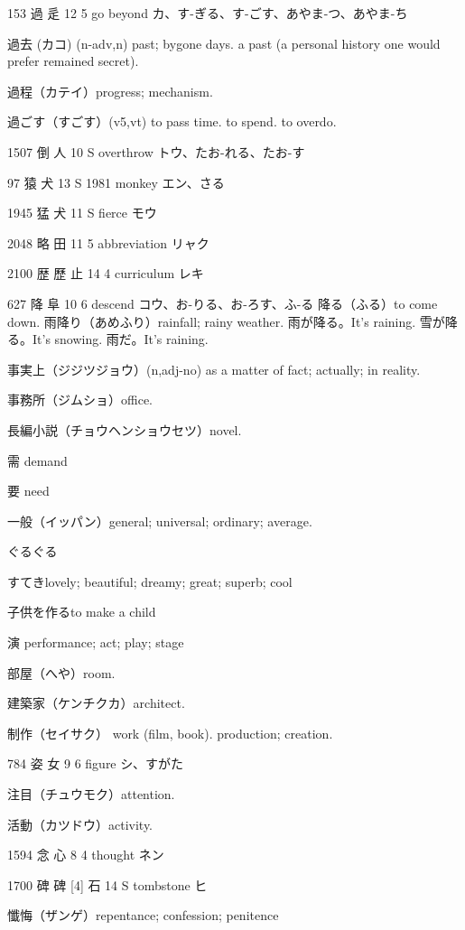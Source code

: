 153	過		辵	12	5		go beyond	カ、す-ぎる、す-ごす、あやま-つ、あやま-ち

過去 (カコ) (n-adv,n)
past; bygone days.
a past (a personal history one would prefer remained secret).

過程（カテイ）progress; mechanism.

過ごす（すごす）(v5,vt) to pass time. to spend. to overdo.

1507	倒		人	10	S		overthrow	トウ、たお-れる、たお-す

97	猿		犬	13	S	1981	monkey	エン、さる

1945	猛		犬	11	S		fierce	モウ

2048	略		田	11	5		abbreviation	リャク

2100	歴	歷	止	14	4		curriculum	レキ

627	降		阜	10	6		descend	コウ、お-りる、お-ろす、ふ-る
降る（ふる）to come down.
雨降り（あめふり）rainfall; rainy weather.
雨が降る。It's raining.
雪が降る。It's snowing.
雨だ。It's raining.

事実上（ジジツジョウ）(n,adj-no)
as a matter of fact; actually; in reality.

事務所（ジムショ）office.

長編小説（チョウヘンショウセツ）novel.

需 demand

要 need

一般（イッパン）general; universal; ordinary; average.

ぐるぐる

すてきlovely; beautiful; dreamy; great; superb; cool


子供を作るto make a child

演 performance; act; play; stage

部屋（へや）room.

建築家（ケンチクカ）architect.

制作（セイサク）
work (film, book).
production; creation.

784	姿		女	9	6		figure	シ、すがた

注目（チュウモク）attention.

活動（カツドウ）activity.

1594	念		心	8	4		thought	ネン

1700	碑	碑 [4]	石	14	S		tombstone	ヒ

懺悔（ザンゲ）repentance; confession; penitence

